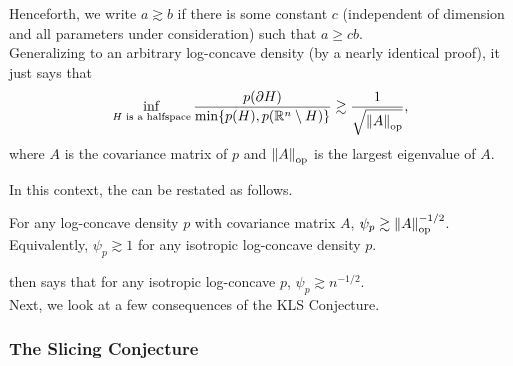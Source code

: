 	Henceforth, we write $a\gtrsim b$ if there is some constant $c$ (independent of dimension and all parameters under consideration) such that $a \geq c b$.\\
	Generalizing  to an arbitrary log-concave density (by a nearly identical proof), it just says that
	\[ \inf_{H\text{ is a halfspace}} \frac{p(\partial H)}{\min\{p(H),p(\mathbb{R}^n\setminus H)\}} \gtrsim \frac{1}{\sqrt{\left\lVert A\right\rVert_{\text{op}}}}, \]
	where $A$ is the covariance matrix of $p$ and $\left\lVert A\right\rVert_{\text{op}}$ is the largest eigenvalue of $A$.

	In this context, the  can be restated as follows. 

	\begin{fcon}
		\label{con: kls conjecture reformulated}
		For any log-concave density $p$ with covariance matrix $A$, $\psi_p \gtrsim \left\lVert A\right\rVert_{\text{op}}^{-1/2}$. Equivalently, $\psi_p\gtrsim 1$ for any isotropic log-concave density $p$.
	\end{fcon}

	 then says that for any isotropic log-concave $p$, $\psi_p \gtrsim n^{-1/2}$.\\





	Next, we look at a few consequences of the KLS Conjecture.

	\subsubsection{The Slicing Conjecture}

